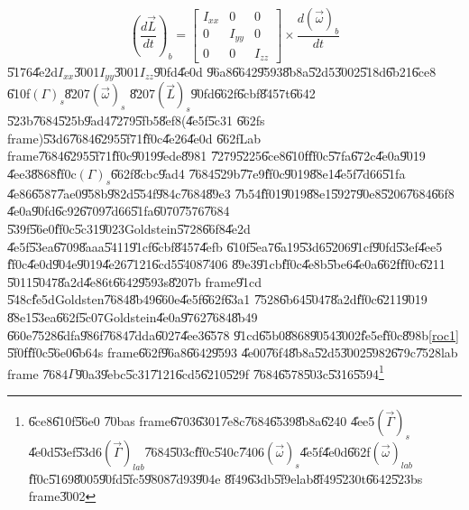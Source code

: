 \documentclass[12pt,a4paper]{article}
\begin{document}
\begin{equation*}
\left( \frac{d\vec{L}}{dt}\right) _{b}=\left[ 
\begin{array}{ccc}
I_{xx} & 0 & 0 \\ 
0 & I_{yy} & 0 \\ 
0 & 0 & I_{zz}%
\end{array}%
\right] \times \frac{d\left( \vec{\omega}\right) _{b}}{dt}
\end{equation*}%
\U{5176}\U{4e2d}$I_{xx}$\U{3001}$I_{yy}$\U{3001}$I_{zz}$\U{90fd}\U{4e0d}%
\U{96a8}\U{6642}\U{9593}\U{8b8a}\U{52d5}\U{3002}\U{518d}\U{6b21}\U{6ce8}%
\U{610f}$\left( \Gamma \right) _{s}$\U{8207}$\left( \vec{\omega}\right) _{s}$%
\U{8207}$\left( \vec{L}\right) _{s}$\U{90fd}\U{662f}\U{6cbf}\U{8457}t\U{6642}%
\U{523b}\U{7684}\U{525b}\U{9ad4}\U{7279}\U{5fb5}\U{8ef8}(\U{4e5f}\U{5c31}%
\U{662f}s frame)\U{53d6}\U{7684}\U{6295}\U{5f71}\U{ff0c}\U{4e26}\U{4e0d}%
\U{662f}Lab frame\U{7684}\U{6295}\U{5f71}\U{ff0c}\U{9019}\U{9ede}\U{8981}%
\U{7279}\U{5225}\U{6ce8}\U{610f}\U{ff0c}\U{57fa}\U{672c}\U{4e0a}\U{9019}%
\U{4ee3}\U{8868}\U{ff0c}$\left( \Gamma \right) _{s}$\U{662f}\U{8cbc}\U{9ad4}%
\U{7684}\U{529b}\U{77e9}\U{ff0c}\U{9019}\U{88e1}\U{4e5f}\U{7d66}\U{51fa}%
\U{4e86}\U{6587}\U{7ae0}\U{958b}\U{982d}\U{554f}\U{984c}\U{7684}\U{89e3}%
\U{7b54}\U{ff01}\U{9019}\U{88e1}\U{5927}\U{90e8}\U{5206}\U{7684}\U{66f8}%
\U{4e0a}\U{90fd}\U{6c92}\U{6709}\U{7d66}\U{51fa}\U{6070}\U{7576}\U{7684}%
\U{539f}\U{56e0}\U{ff0c}\U{5c31}\U{9023}Goldstein\U{5728}\U{66f8}\U{4e2d}%
\U{4e5f}\U{53ea}\U{6709}\U{8aaa}\U{5411}\U{91cf}\U{6cbf}\U{8457}\U{4efb}%
\U{610f}\U{5ea7}\U{6a19}\U{53d6}\U{5206}\U{91cf}\U{90fd}\U{53ef}\U{4ee5}%
\U{ff0c}\U{4e0d}\U{904e}\U{9019}\U{4e26}\U{7121}\U{6cd5}\U{5408}\U{7406}%
\U{89e3}\U{91cb}\U{ff0c}\U{4e8b}\U{5be6}\U{4e0a}\U{662f}\U{ff0c}\U{6211}%
\U{5011}\U{5047}\U{8a2d}\U{4e86}t\U{6642}\U{9593}s\U{8207}b frame\U{91cd}%
\U{548c}\U{fe5d}Goldsten\U{7684}\U{8b49}\U{660e}\U{4e5f}\U{662f}\U{63a1}%
\U{7528}\U{6b64}\U{5047}\U{8a2d}\cite{goldstein}\U{ff0c}\U{6211}\U{9019}%
\U{88e1}\U{53ea}\U{662f}\U{5c07}Goldstein\U{4e0a}\U{9762}\U{7684}\U{8b49}%
\U{660e}\U{7528}\U{6dfa}\U{986f}\U{7684}\U{7dda}\U{6027}\U{4ee3}\U{6578}%
\U{91cd}\U{65b0}\U{8868}\U{9054}\U{3002}\U{fe5e}\U{ff0c}\U{898b}\ref{roc1}%
\U{5f0f}\U{ff0c}\U{56e0}\U{6b64}s frame\U{662f}\U{96a8}\U{6642}\U{9593}%
\U{4e00}\U{76f4}\U{8b8a}\U{52d5}\U{3002}\U{5982}\U{679c}\U{7528}lab frame%
\U{7684}$\Gamma $\U{90a3}\U{9ebc}\U{5c31}\U{7121}\U{6cd5}\U{6210}\U{529f}%
\U{7684}\U{6578}\U{503c}\U{5316}\U{5594}\footnote{\U{6ce8}\U{610f}\U{56e0}%
\U{70ba}s frame\U{6703}\U{6301}\U{7e8c}\U{7684}\U{6539}\U{8b8a}\U{6240}%
\U{4ee5}$\left( \vec{\Gamma}\right) _{s}$\U{4e0d}\U{53ef}\U{53d6}$\left( 
\vec{\Gamma}\right) _{lab}$\U{7684}\U{503c}\U{ff0c}\U{540c}\U{7406}$\left( 
\vec{\omega}\right) _{s}$\U{4e5f}\U{4e0d}\U{662f}$\left( \vec{\omega}\right)
_{lab}$\U{ff0c}\U{5169}\U{8005}\U{90fd}\U{5fc5}\U{9808}\U{7d93}\U{904e}%
\U{8f49}\U{63db}\U{5f9e}lab\U{8f49}\U{5230}t\U{6642}\U{523b}s frame\U{3002}}%
\end{document}
